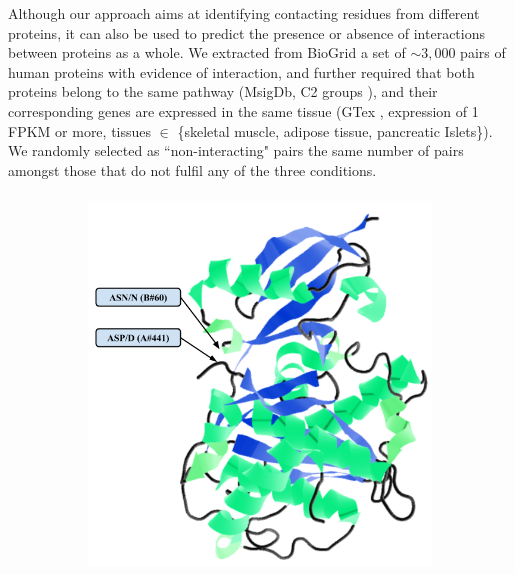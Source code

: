 Although our approach aims at identifying contacting residues from different proteins, it can also be used to predict the presence or absence of interactions between proteins as a whole. 
We extracted from BioGrid \cite{stark2006biogrid} a set of $\sim3,000$ pairs of human proteins with evidence of interaction, and further required that both proteins belong to the same pathway (MsigDb, C2 groups \cite{subramanian2005gene}), and their corresponding genes are expressed in the same tissue (GTex \cite{lonsdale2013genotype}, expression of 1 FPKM or more, tissues $\in$ \{skeletal muscle, adipose tissue, pancreatic Islets\}). We randomly selected as ``non-interacting" pairs the same number of pairs amongst those that do not fulfil any of the three conditions.

\begin{figure}[p]
\begin{subfigure}[t]{0.7\textwidth}
  \centering
  \includegraphics[height=10cm]{figs/gwas_figure_4_jmol.png}
  \label{fig:sub1}
\end{subfigure}
\begin{subfigure}[t]{.2\textwidth}
  \centering

\end{subfigure}
\end{figure}

